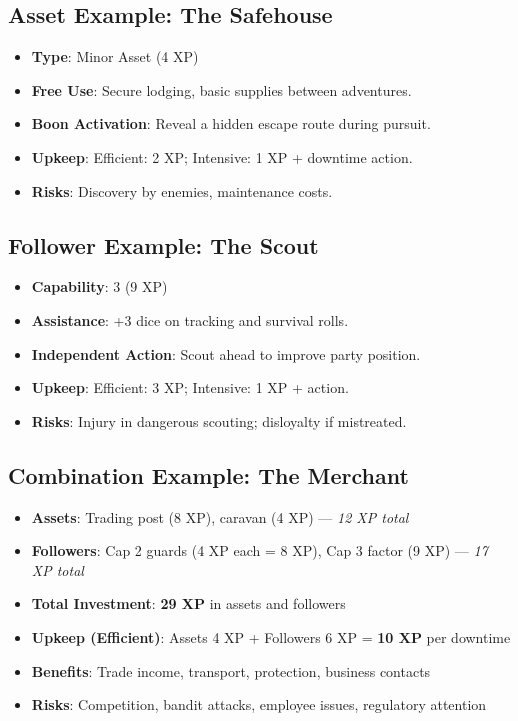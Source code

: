 \subsection*{Asset Example: The Safehouse}
\label{sec:example-safehouse}
\begin{itemize}
\item \textbf{Type}: Minor Asset (4 XP)
\item \textbf{Free Use}: Secure lodging, basic supplies between adventures.
\item \textbf{Boon Activation}: Reveal a hidden escape route during pursuit.
\item \textbf{Upkeep}: Efficient: 2 XP; Intensive: 1 XP + downtime action.
\item \textbf{Risks}: Discovery by enemies, maintenance costs.
\end{itemize}

\subsection*{Follower Example: The Scout}
\label{sec:example-scout}
\begin{itemize}
\item \textbf{Capability}: 3 (9 XP)
\item \textbf{Assistance}: +3 dice on tracking and survival rolls.
\item \textbf{Independent Action}: Scout ahead to improve party position.
\item \textbf{Upkeep}: Efficient: 3 XP; Intensive: 1 XP + action.
\item \textbf{Risks}: Injury in dangerous scouting; disloyalty if mistreated.
\end{itemize}

\subsection*{Combination Example: The Merchant}
\label{sec:example-merchant}
\begin{itemize}
\item \textbf{Assets}: Trading post (8 XP), caravan (4 XP) --- \emph{12 XP total}
\item \textbf{Followers}: Cap 2 guards (4 XP each = 8 XP), Cap 3 factor (9 XP) --- \emph{17 XP total}
\item \textbf{Total Investment}: \textbf{29 XP} in assets and followers
\item \textbf{Upkeep (Efficient)}: Assets 4 XP + Followers 6 XP = \textbf{10 XP} per downtime
\item \textbf{Benefits}: Trade income, transport, protection, business contacts
\item \textbf{Risks}: Competition, bandit attacks, employee issues, regulatory attention
\end{itemize}

